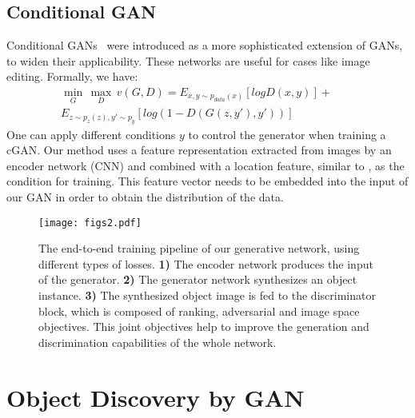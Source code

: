 \documentclass[runningheads]{llncs}
\begin{document}
\subsection*{Conditional GAN}
Conditional GANs~\cite{cgan,perarnau} were introduced as a more sophisticated extension of GANs, to widen their applicability. These networks are useful for cases like image editing.  Formally, we have:
\begin{equation}
\begin{split}
\min_{G}\,\max_{D}\, v(G,D) = E_{x,y\sim p_{data}(x)}[log D(x,y)] + \qquad \\
E_{z\sim p_{z}(z),y'\sim p_{y}}[log(1- D(G(z,y'),y'))]
\end{split}
\label{eq:1}
\end{equation}
One can apply different conditions $y$ to control the generator when training a cGAN.  Our method uses a feature representation extracted from images by an encoder network (CNN) and combined with a location feature, similar to \cite{dosovitskiy2,pathak}, as the condition for training. This feature vector needs to be embedded into the input of our GAN in order to obtain the distribution of the data.  

\begin{figure*}[t]
 \centering
 \texttt{[image: figs2.pdf]}
 \caption{The end-to-end training pipeline of our generative network, using different types of losses. \textbf{1)} The encoder network produces the input of the generator. \textbf{2)} The generator network synthesizes an object instance. \textbf{3)} The synthesized object image is fed to the discriminator block,  which is composed of ranking, adversarial and image space objectives. This joint objectives help to improve the generation and discrimination capabilities of the whole network.}
\label{fig:pipeline}
\end{figure*}


\section{Object Discovery by GAN} \label{sec:method}
\end{document}
